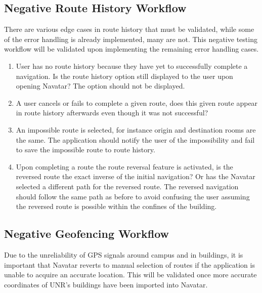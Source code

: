 \documentclass{scrreprt}
\begin{document}
\subsection{Negative Route History Workflow}

There are various edge cases in route history that must be validated, while some of the error handling is already implemented, many are not. This negative testing workflow will be validated upon implementing the remaining error handling cases.

\begin{enumerate}
	\item User has no route history because they have yet to successfully complete a navigation. Is the route history option still displayed to the user upon opening Navatar? The option should not be displayed.
	
	\item A user cancels or fails to complete a given route, does this given route appear in route history afterwards even though it was not successful?
	
	\item An impossible route is selected, for instance origin and destination rooms are the same. The application should notify the user of the impossibility and fail to save the impossible route to route history.
	
	\item Upon completing a route the route reversal feature is activated, is the reversed route the exact inverse of the initial navigation? Or has the Navatar selected a different path for the reversed route. The reversed navigation should follow the same path as before to avoid confusing the user assuming the reversed route is possible within the confines of the building.

\end{enumerate}

\subsection{Negative Geofencing Workflow}

Due to the unreliability of GPS signals around campus and in buildings, it is important that Navatar reverts to manual selection of routes if the application is unable to acquire an accurate location. This will be validated once more accurate coordinates of UNR’s buildings have been imported into Navatar.
\end{document}
